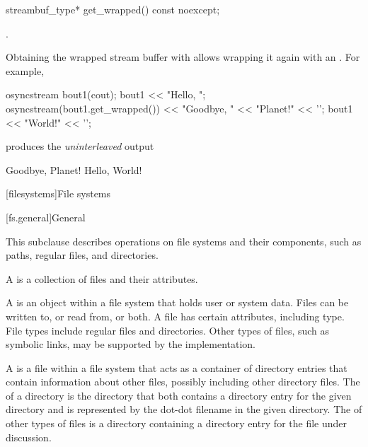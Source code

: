 %
\begin{itemdecl}
streambuf_type* get_wrapped() const noexcept;
\end{itemdecl}

\begin{itemdescr}
\pnum
\returns
{}.

\pnum
\begin{example}
Obtaining the wrapped stream buffer with 
allows wrapping it again with an .
For example,
\begin{codeblock}
{
  osyncstream bout1(cout);
  bout1 << "Hello, ";
  {
    osyncstream(bout1.get_wrapped()) << "Goodbye, " << "Planet!" << '\n';
  }
  bout1 << "World!" << '\n';
}
\end{codeblock}
produces the \textit{uninterleaved} output
\begin{outputblock}
Goodbye, Planet!
Hello, World!
\end{outputblock}
\end{example}
\end{itemdescr}

[filesystems]{File systems}

[fs.general]{General}

\pnum
This subclause describes operations on file systems and their components, such as paths,
regular files, and directories.

\pnum
A  is
a collection of files and their attributes.

\pnum
A  is
an object within a file system that holds user or system data. Files can be written to, or read from, or both. A file
has certain attributes, including type. File types include regular files
and directories. Other types of files, such as symbolic links,
may be supported by the implementation.

\pnum
A  is
a file within a file system that acts as a container of directory entries
that contain information about
other files, possibly including other directory files.
The  of a directory is
the directory that both contains a
directory entry for the given directory and is represented by the dot-dot
filename in the given directory.
The 
of other types of files is a directory containing a directory
entry for the file under discussion.

